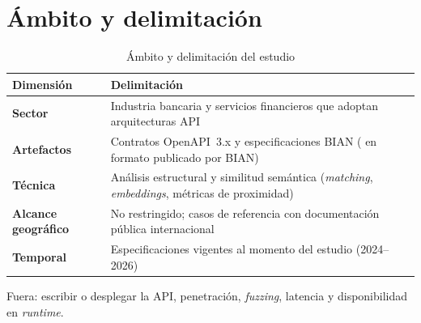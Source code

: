 \section{Ámbito y delimitación}

\begin{table}[H]
  \centering
  \caption{Ámbito y delimitación del estudio}
  \label{tab:ambito}
  \begin{tabular}{@{}p{}p{}@{}}
    \toprule
    \textbf{Dimensión} & \textbf{Delimitación} \\
    \midrule
    \textbf{Sector} &
    Industria bancaria y servicios financieros que adoptan arquitecturas API \\
    \textbf{Artefactos} &
    Contratos OpenAPI~3.x y especificaciones BIAN (\ServiceDomain{} en formato publicado por BIAN) \\
    \textbf{Técnica} &
    Análisis estructural y similitud semántica (\textit{matching}, \textit{embeddings}, métricas de
    proximidad) \\
    \textbf{Alcance geográfico} &
    No restringido; casos de referencia con documentación pública internacional \\
    \textbf{Temporal} &
    Especificaciones vigentes al momento del estudio (2024--2026) \\
    \bottomrule
  \end{tabular}
\end{table}

Fuera: escribir o desplegar la API, penetración, \textit{fuzzing}, latencia y disponibilidad en
\textit{runtime}.
